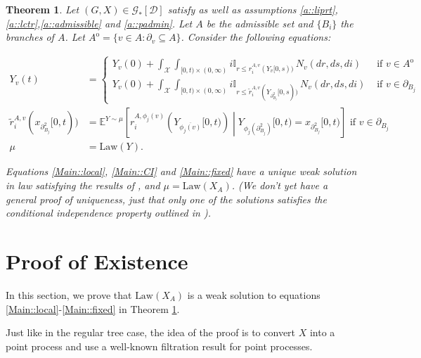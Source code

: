 \documentclass[12pt]{article}
\newcommand{\mb}{\mathbb}
\newcommand{\mc}{\mathcal}
\newcommand{\ov}{\overline}
\newcommand{\te}{\text}
\newcommand{\ind}{\hspace{24pt}}
\newcommand{\exmu}[2]{\mb{E}^{#1}\left[#2\right]}	%
\newcommand{\cad}{\mc{D}}							%
\newcommand{\sta}{\mc{X}}							%
\newcommand{\neigh}[1]{\partial_{#1}}				%
\newcommand{\dneigh}[1]{\partial^2_{#1}}			%
\newcommand{\cl}[1]{\ov{#1}}						%
\newcommand{\Xf}{X}									%
\newcommand{\poiss}{N}								%
\newcommand{\rate}{r}								%
\newcommand{\poissv}[1]{_{#1}}						%
\newcommand{\vind}[1]{_{#1}}						%
\newcommand{\tme}[1]{(#1)}							%
\newcommand{\tmi}[1]{#1}							%
\newcommand{\stpara}[1]{_{#1}}						%
\newcommand{\gvpara}[2]{^{#1,#2}}					%
\newcommand{\Gs}{\mc{G}_\ast}						%
\renewcommand{\sp}[1]{[#1]}							%
\newcommand{\Xg}{Y}									%
\newcommand{\brate}{\alt{\rate}}					%
\newcommand{\inte}[1]{{#1}^\mathrm{o}}				%
\newcommand{\alt}[1]{\tilde{#1}}					%
\newcommand{\law}{\te{Law}}							%
\newtheorem{thms}{Theorem}[section]
\begin{document}
\begin{thms}
Let \((G,\Xf) \in \Gs\sp{\cad}\) satisfy \cite[assumptions \ref{F-a::bddinit},\ref{F-a::bddr}, \ref{F-a::liprx}, \ref{F-CI::indinit}]{F} as well as assumptions \ref{a::liprt},\ref{a::lctr},\ref{a::admissible} and \ref{a::padmin}. Let \(A\) be the admissible set and \(\{B_i\}\) the branches of \(A\). Let \(\inte{A} = \{v \in A: \neigh{v} \subseteq A\}\). Consider the following equations:

\begin{align}
\Xg\vind{v}\tme{t} &= 
\begin{cases}
\Xg\vind{v}\tme{0} + \int_{\sta} \int_{[0,t)\times (0,\infty)} i\mb{I}_{r\leq \rate\gvpara{A}{v}\stpara{i}(\Xg\vind{\cl{v}}\tmi{[0,s)})}\,\poiss\poissv{v}(dr,ds,di) & \te{ if } v \in \inte{A}\\
\Xg\vind{v}\tme{0} + \int_{\sta} \int_{[0,t)\times (0,\infty)} i\mb{I}_{r\leq \brate\gvpara{A}{v}\stpara{i}(\Xg\vind{\dneigh{B_j}}\tmi{[0,s)})}\,\poiss\poissv{v}(dr,ds,di) &\te{ if } v \in \neigh{B_j}
\end{cases}\label{Main::local}\\
\brate\gvpara{A}{v}\stpara{i}(x_{\dneigh{B_j}}[0,t)) &= \exmu{\Xg \sim \mu}{\rate\gvpara{A}{\phi_j(v)}\stpara{i}\left(\Xg\vind{\cl{\phi_j(v)}}\tmi{[0,t)}\right)\middle|\Xg\vind{\phi_j(\dneigh{B_j})}\tmi{[0,t)} = x\vind{\dneigh{B_j}}\tmi{[0,t)}} \te{ if } v \in \neigh{B_j}\label{Main::CI}\\
\mu &= \law(\Xg).\label{Main::fixed}
\end{align}

Equations \eqref{Main::local}, \eqref{Main::CI} and \eqref{Main::fixed} have a unique weak solution in law satisfying the results of \cite[theorem \ref{F-CI::CI}]{F}, and \(\mu = \law(\Xf\vind{A})\). (We don't yet have a general proof of uniqueness, just that only one of the solutions satisfies the conditional independence property outlined in \cite[section \ref{F-CI}]{F}).
\label{Main::Main}
\end{thms}

\section{Proof of Existence}
\label{Ex}

In this section, we prove that \(\law(\Xf\vind{A})\) is a weak solution to equations \eqref{Main::local}-\eqref{Main::fixed} in Theorem \ref{Main::Main}.

\ind Just like in the regular tree case, the idea of the proof is to convert \(\Xf\) into a point process and use a well-known filtration result for point processes.
\end{document}
